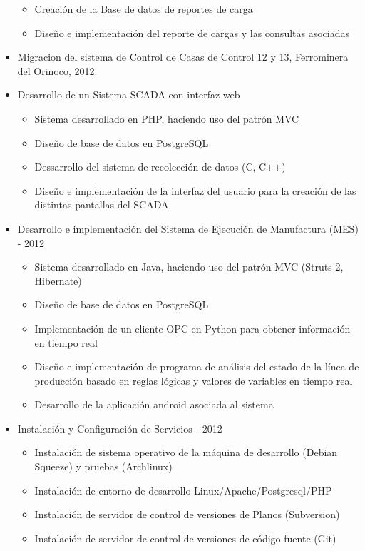 \documentclass[letterpaper,11pt]{report}
\begin{document}
\begin{itemize}
      \begin{itemize}
        \item Creación de la Base de datos de reportes de carga
        \item Diseño e implementación del reporte de cargas y las consultas asociadas
      \end{itemize}
    \item Migracion del sistema de Control de Casas de Control 12 y 13, Ferrominera del Orinoco, 2012.
    \item Desarrollo de un Sistema SCADA con interfaz web
        \begin{itemize}
        \item Sistema desarrollado en PHP, haciendo uso del patrón MVC
        \item Diseño de base de datos en PostgreSQL
        \item Dessarrollo del sistema de recolección de datos (C, C++)
        \item Diseño e implementación de la interfaz del usuario para la creación de las distintas pantallas del SCADA
        \end{itemize}
    \item Desarrollo e implementación del Sistema de Ejecución de Manufactura (MES) - 2012
        \begin{itemize}
        \item Sistema desarrollado en Java, haciendo uso del patrón MVC (Struts 2, Hibernate)
        \item Diseño de base de datos en PostgreSQL
        \item Implementación de un cliente OPC en Python para obtener información en tiempo real
        \item Diseño e implementación de programa de análisis del estado de la línea de producción basado en reglas lógicas y valores de variables en tiempo real
        \item Desarrollo de la aplicación android asociada al sistema
        \end{itemize}
    \item Instalación y Configuración de Servicios - 2012
        \begin{itemize}
        \item Instalación de sistema operativo de la máquina de desarrollo (Debian Squeeze) y pruebas (Archlinux)
        \item Instalación de entorno de desarrollo Linux/Apache/Postgresql/PHP
        \item Instalación de servidor de control de versiones de Planos (Subversion)
        \item Instalación de servidor de control de versiones de código fuente (Git)
        \end{itemize}
  \end{itemize}
\end{document}
